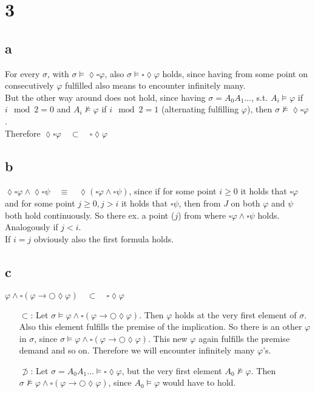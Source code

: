 \documentclass[11pt]{article}
\begin{document}
\section{3}
\subsection{a}
For every $\sigma$, with $\sigma \models \lozenge\square\varphi$, also $\sigma \models \square\lozenge\varphi$ holds, since having from some point on consecutively $\varphi$ fulfilled also means to encounter infinitely many.\\
But the other way around does not hold, since having $\sigma = A_0A_1\dots$, s.t. $A_i \models \varphi$ if $i \mod 2 = 0$ and $A_i \not\models \varphi$ if $i \mod 2 = 1$ (alternating fulfilling $\varphi$), then $\sigma \not \models \lozenge\square\varphi$.\\
Therefore $\lozenge\square\varphi \quad \subset \quad \square\lozenge\varphi $

\subsection{b}
$\lozenge\square\varphi \land \lozenge\square \psi \quad \equiv \quad \lozenge(\square\varphi \land \square\psi)$, since if for some point $i \ge0 $ it holds that $\square\varphi$ and for some point $j \ge 0, j > i$ it holds that $\square \psi$, then from $J$ on both $\varphi$ and $\psi$ both hold continuously. So there ex. a point ($j$) from where $\square\varphi \land \square\psi$ holds.\\
Analogously if $j <i$.\\
If $i=j$ obviously also the first formula holds.

\subsection{c}
$\varphi \land \square(\varphi \rightarrow \bigcirc\lozenge\varphi) \quad \subset \quad \square\lozenge\varphi$
\begin{itemize}
\item[$\subset$:] Let $\sigma \models \varphi \land \square(\varphi \rightarrow \bigcirc\lozenge\varphi)$. Then $\varphi$ holds at the very first element of $\sigma$. Also this element fulfills the premise of the implication. So there is an other $\varphi$ in $\sigma$, since $\sigma \models \varphi \land \square(\varphi \rightarrow \bigcirc\lozenge\varphi)$. This new $\varphi$ again fulfills the premise demand and so on. Therefore we will encounter infinitely many $\varphi$'s.
\item[$\not\supset$:] Let $\sigma = A_0A_1\dots \models \square\lozenge\varphi$, but the very first element $A_0 \not\models\varphi$. Then $\sigma\not\models \varphi \land \square(\varphi \rightarrow \bigcirc\lozenge\varphi)$, since $A_0 \models\varphi$ would have to hold.
\end{itemize}
\end{document}
